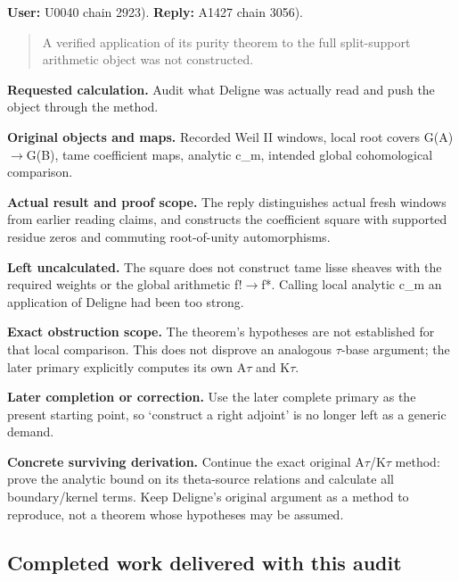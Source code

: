 \documentclass[10pt,a4paper,oneside]{report}
\begin{document}
\textbf{User:} U0040
\protect{} chain 2923).
\textbf{Reply:} A1427
\protect{} chain 3056).

\begin{quote}
A verified application of its purity theorem to the full split-support
arithmetic object was not constructed.
\end{quote}

\textbf{Requested calculation.} Audit what Deligne was actually read and
push the object through the method.

\textbf{Original objects and maps.} Recorded Weil II windows, local root
covers G(A)\allowbreak{}\ensuremath{→}\allowbreak{}G(B), tame
coefficient maps, analytic c\_m, intended global cohomological
comparison.

\textbf{Actual result and proof scope.} The reply distinguishes actual
fresh windows from earlier reading claims, and constructs the
coefficient square with supported residue zeros and commuting
root-of-unity automorphisms.

\textbf{Left uncalculated.} The square does not construct tame lisse
sheaves with the required weights or the global arithmetic
f!\allowbreak{}\ensuremath{→}\allowbreak{}f*. Calling local analytic
c\_m an application of Deligne had been too strong.

\textbf{Exact obstruction scope.} The theorem's hypotheses are not
established for that local comparison. This does not disprove an
analogous \allowbreak{}\ensuremath{τ}\allowbreak{}-base argument; the
later primary explicitly computes its own
A\allowbreak{}\ensuremath{τ}\allowbreak{} and
K\allowbreak{}\ensuremath{τ}\allowbreak{}.

\textbf{Later completion or correction.} Use the later complete primary
as the present starting point, so `construct a right adjoint' is no
longer left as a generic demand.

\textbf{Concrete surviving derivation.} Continue the exact original
A\allowbreak{}\ensuremath{τ}\allowbreak{}/K\allowbreak{}\ensuremath{τ}\allowbreak{}
method: prove the analytic bound on its theta-source relations and
calculate all boundary/kernel terms. Keep Deligne's original argument as
a method to reproduce, not a theorem whose hypotheses may be assumed.

\subsection{Completed work delivered with this
audit}\label{completed-work-delivered-with-this-audit}
\end{document}
